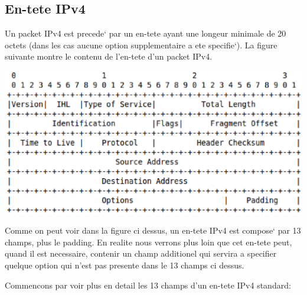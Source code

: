 
\subsection{En-tete IPv4}
Un packet IPv4 est precede` par un en-tete ayant une longeur minimale de 20 octets 
(dans les cas aucune option supplementaire a ete specifie`).
La figure suivante montre le contenu de l'en-tete d'un packet IPv4.


\includegraphics[width=15cm]{./pics/IPv4header.eps}


Comme on peut voir dans la figure ci dessus, un en-tete IPv4 est compose` par
13 champs, plus le padding. En realite nous verrons plus loin que cet en-tete
peut, quand il est necessaire, contenir un champ additionel qui servira a
specifier quelque option qui n'est pas presente dans le 13 champs ci dessus.


Commencons par voir plus en detail les 13 champs d'un en-tete IPv4 standard:

